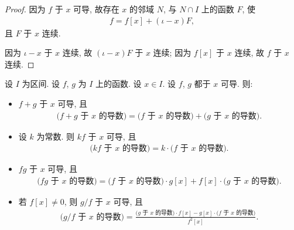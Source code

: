 \begin{proof}
    因为 $f$ 于 $x$ 可导,
    故存在 $x$ 的邻域 $N$,
    与 $N \cap I$ 上的函数 $F$,
    使
    \begin{align*}
        f = f[x] + (\iota - x)F,
    \end{align*}
    且 $F$ 于 $x$ 连续.

    因为 $\iota - x$ 于 $x$ 连续,
    故 $(\iota - x)F$ 于 $x$ 连续;
    因为 $f[x]$ 于 $x$ 连续,
    故 $f$ 于 $x$ 连续.
\end{proof}

\begin{theorem}
    设 $I$ 为区间.
    设 $f$, $g$ 为 $I$ 上的函数.
    设 $x \in I$.
    设 $f$, $g$ 都于 $x$ 可导.
    则:
    \begin{itemize}
        \item $f + g$ 于 $x$ 可导, 且
              \begin{align*}
                  \text{($f + g$ 于 $x$ 的导数)} = \text{($f$ 于 $x$ 的导数)} + \text{($g$ 于 $x$ 的导数)}.
              \end{align*}
        \item 设 $k$ 为常数.
              则 $kf$ 于 $x$ 可导, 且
              \begin{align*}
                  \text{($kf$ 于 $x$ 的导数)} = k \cdot \text{($f$ 于 $x$ 的导数)}.
              \end{align*}
        \item $fg$ 于 $x$ 可导, 且
              \begin{align*}
                  \text{($fg$ 于 $x$ 的导数)} = \text{($f$ 于 $x$ 的导数)} \cdot g[x] + f[x] \cdot \text{($g$ 于 $x$ 的导数)}.
              \end{align*}
        \item 若 $f[x] \neq 0$, 则 $g/f$ 于 $x$ 可导, 且
              \begin{align*}
                  \text{(${g}/{f}$ 于 $x$ 的导数)} = \frac{\text{($g$ 于 $x$ 的导数)} \cdot f[x] - g[x] \cdot \text{($f$ 于 $x$ 的导数)}}{f^2 [x]}.
              \end{align*}
    \end{itemize}
\end{theorem}

